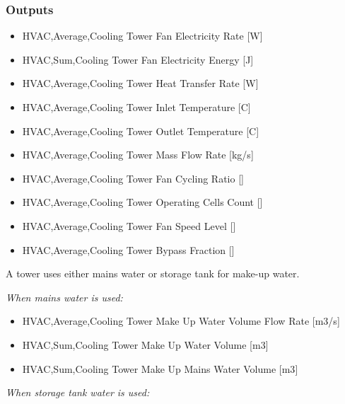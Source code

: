 \subsubsection{Outputs}\label{outputs-1-003}

\begin{itemize}
\item
  HVAC,Average,Cooling Tower Fan Electricity Rate {[}W{]}
\item
  HVAC,Sum,Cooling Tower Fan Electricity Energy {[}J{]}
\item
  HVAC,Average,Cooling Tower Heat Transfer Rate {[}W{]}
\item
  HVAC,Average,Cooling Tower Inlet Temperature {[}C{]}
\item
  HVAC,Average,Cooling Tower Outlet Temperature {[}C{]}
\item
  HVAC,Average,Cooling Tower Mass Flow Rate {[}kg/s{]}
\item
  HVAC,Average,Cooling Tower Fan Cycling Ratio {[]}
\item
  HVAC,Average,Cooling Tower Operating Cells Count {[]}
\item
  HVAC,Average,Cooling Tower Fan Speed Level {[]}
\item
  HVAC,Average,Cooling Tower Bypass Fraction {[]}
\end{itemize}

A tower uses either mains water or storage tank for make-up water.

\emph{When mains water is used:}

\begin{itemize}
\item
  HVAC,Average,Cooling Tower Make Up Water Volume Flow Rate {[}m3/s{]}
\item
  HVAC,Sum,Cooling Tower Make Up Water Volume {[}m3{]}
\item
  HVAC,Sum,Cooling Tower Make Up Mains Water Volume {[}m3{]}
\end{itemize}

\emph{When storage tank water is used:}

